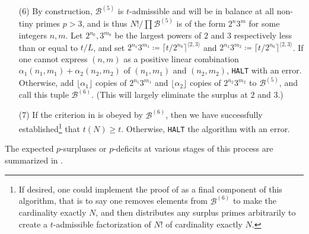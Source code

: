 \documentclass[12pt,a4paper,reqno]{amsart}
\numberwithin{equation}{section}
\theoremstyle{plain}
\theoremstyle{definition}
\newcommand\tuple{{\mathcal B}}
\begin{document}
\begin{enumerate}
\item[(6)] By construction, $\tuple^{(5)}$ is $t$-admissible and will be in balance at all non-tiny primes $p>3$, and is thus $N!/\prod \tuple^{(5)}$ is of the form $2^n 3^m$ for some integers $n,m$.  Let $2^{n_0}, 3^{m_0}$ be the largest powers of $2$ and $3$ respectively less than or equal to $t/L$, and set $2^{n_1} 3^{m_1} \coloneqq \lceil t/2^{n_0} \rceil^{\langle 2,3 \rangle}$ and $2^{n_2} 3^{m_2} \coloneqq \lceil t/2^{n_0} \rceil^{\langle 2,3 \rangle}$.  If one cannot express $(n,m)$ as a positive linear combination $\alpha_1 (n_1,m_1) + \alpha_2 (n_2,m_2)$ of $(n_1,m_1)$ and $(n_2,m_2)$, \texttt{HALT} with an error.  Otherwise, add $\lfloor \alpha_1 \rfloor$ copies of $2^{n_1} 3^{m_1}$ and $\lfloor \alpha_2 \rfloor$ copies of $2^{n_2} 3^{m_2}$ to $\tuple^{(5)}$, and call this tuple $\tuple^{(6)}$.  (This will largely eliminate the surplus at $2$ and $3$.)
\item[(7)] If the criterion in  is obeyed by $\tuple^{(6)}$, then we have successfully established\footnote{If desired, one could implement the proof of  as a final component of this algorithm, that is to say one removes elements from $\tuple^{(6)}$ to make the cardinality exactly $N$, and then distributes any surplus primes arbitrarily to create a $t$-admissible factorization of $N!$ of cardinality exactly $N$.} that $t(N) \geq t$.  Otherwise, \texttt{HALT} the algorithm with an error. 
\end{enumerate}

The expected $p$-surpluses or $p$-deficits at various stages of this process are summarized in .
\end{document}
